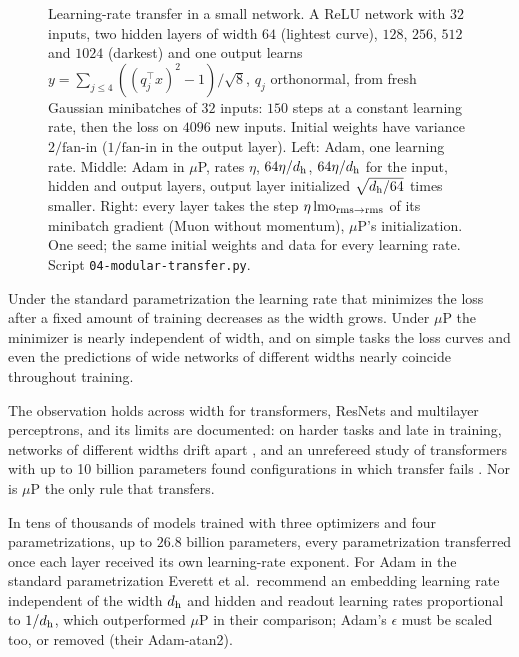 \begin{refsection}
\begin{figure}[t]
\begin{fullwidth}
\end{fullwidth}
\caption{Learning-rate transfer in a small network. A ReLU network with $32$ inputs, two hidden layers of width $64$ (lightest curve), $128$, $256$, $512$ and $1024$ (darkest) and one output learns $y=\sum_{j\le4}((q_j^\top x)^2-1)/\sqrt8$, $q_j$ orthonormal, from fresh Gaussian minibatches of $32$ inputs: $150$ steps at a constant learning rate, then the loss on $4096$ new inputs. Initial weights have variance $2/\text{fan-in}$ ($1/\text{fan-in}$ in the output layer). Left: Adam, one learning rate. Middle: Adam in $\mu$P, rates $\eta$, $64\eta/d_{\mathrm h}$, $64\eta/d_{\mathrm h}$ for the input, hidden and output layers, output layer initialized $\sqrt{d_{\mathrm h}/64}$ times smaller. Right: every layer takes the step $\eta\operatorname{lmo}_{\mathrm{rms}\to\mathrm{rms}}$ of its minibatch gradient (Muon without momentum), $\mu$P's initialization. One seed; the same initial weights and data for every learning rate. Script \texttt{04-modular-transfer.py}.}
\label{fig:modular:curves}
\end{figure}

\begin{observation}\label{obs:modular:transfer}
Under the standard parametrization the learning rate that minimizes the loss after a fixed amount of training decreases as the width grows. Under $\mu$P the minimizer is nearly independent of width, and on simple tasks the loss curves and even the predictions of wide networks of different widths nearly coincide throughout training.
\end{observation}

The observation holds across width for transformers, ResNets and multilayer perceptrons, and its limits are documented: on harder tasks and late in training, networks of different widths drift apart \parencite{VyasEtAl2023}, and an unrefereed study of transformers with up to 10 billion parameters found configurations in which transfer fails \parencite{Lingle2024}. Nor is $\mu$P the only rule that transfers.

\begin{observation}\label{obs:modular:everett}
In tens of thousands of models trained with three optimizers and four parametrizations, up to $26.8$ billion parameters, every parametrization transferred once each layer received its own learning-rate exponent. For Adam in the standard parametrization Everett et al.\ recommend an embedding learning rate independent of the width $d_{\mathrm h}$ and hidden and readout learning rates proportional to $1/d_{\mathrm h}$, which outperformed $\mu$P in their comparison; Adam's $\epsilon$ must be scaled too, or removed (their Adam-atan2).
\end{observation}


\end{refsection}
